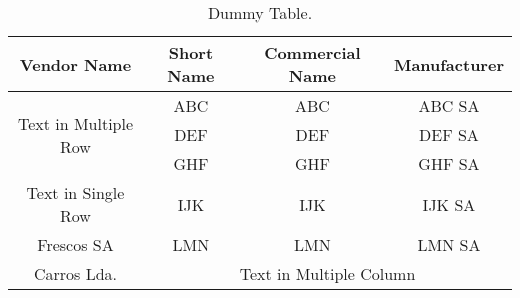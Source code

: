 \begin{table}[H]
	\centering
	\caption{Dummy Table.}
	\begin{tabular}{|c|c|c|c|} \hline
		\textbf{Vendor Name} 				& \textbf{Short Name}	& \textbf{Commercial Name}	& \textbf{Manufacturer}	\\ \hline \hline
		\multirow{3}{*}{Text in Multiple Row}		&	ABC				&  ABC\textreg				& ABC SA			         \\ \cline{2-4}
		 								&        DEF				&  DEF\textreg				& DEF SA				\\ \cline{2-4}
										&        GHF			&  GHF\textreg				& GHF SA				\\ \hline
		Text in Single Row					&        IJK				& IJK\textreg				& IJK SA				\\ \hline
		Frescos SA						&        LMN			& LMN\textreg				& LMN SA				\\ \hline
		Carros Lda.						&    \multicolumn{3}{|c|}{Text in Multiple Column}							\\ \hline
	\end{tabular}
	\label{tab:dummytable}
\end{table}

